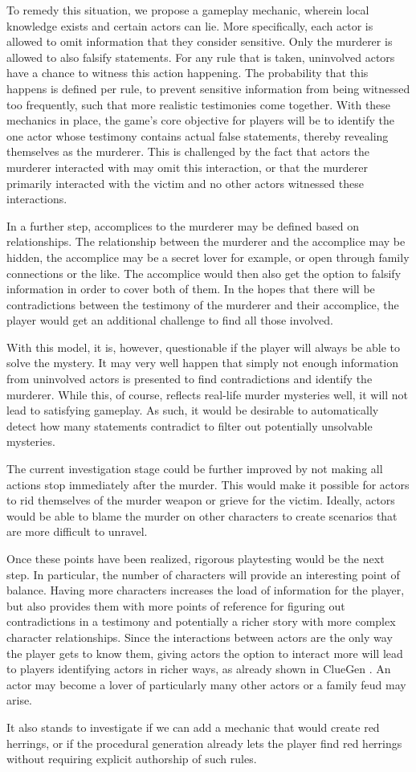 To remedy this situation, we propose a gameplay mechanic, wherein local knowledge exists and certain actors can lie.
More specifically, each actor is allowed to omit information that they consider sensitive.
Only the murderer is allowed to also falsify statements.
For any rule that is taken, uninvolved actors have a chance to witness this action happening.
The probability that this happens is defined per rule, to prevent sensitive information from being witnessed too frequently, such that more realistic testimonies come together.
With these mechanics in place, the game's core objective for players will be to identify the one actor whose testimony contains actual false statements, thereby revealing themselves as the murderer.
This is challenged by the fact that actors the murderer interacted with may omit this interaction, or that the murderer primarily interacted with the victim and no other actors witnessed these interactions.

In a further step, accomplices to the murderer may be defined based on relationships.
The relationship between the murderer and the accomplice may be hidden, the accomplice may be a secret lover for example, or open through family connections or the like.
The accomplice would then also get the option to falsify information in order to cover both of them.
In the hopes that there will be contradictions between the testimony of the murderer and their accomplice, the player would get an additional challenge to find all those involved.

With this model, it is, however, questionable if the player will always be able to solve the mystery.
It may very well happen that simply not enough information from uninvolved actors is presented to find contradictions and identify the murderer.
While this, of course, reflects real-life murder mysteries well, it will not lead to satisfying gameplay.
As such, it would be desirable to automatically detect how many statements contradict to filter out potentially unsolvable mysteries.

The current investigation stage could be further improved by not making all actions stop immediately after the murder.
This would make it possible for actors to rid themselves of the murder weapon or grieve for the victim.
Ideally, actors would be able to blame the murder on other characters to create scenarios that are more difficult to unravel.

Once these points have been realized, rigorous playtesting would be the next step.
In particular, the number of characters will provide an interesting point of balance.
Having more characters increases the load of information for the player, but also provides them with more points of reference for figuring out contradictions in a testimony and potentially a richer story with more complex character relationships.
Since the interactions between actors are the only way the player gets to know them, giving actors the option to interact more will lead to players identifying actors in richer ways, as already shown in ClueGen \cite{stockdale_2016}.
An actor may become a lover of particularly many other actors or a family feud may arise.

It also stands to investigate if we can add a mechanic that would create red herrings, or if the procedural generation already lets the player find red herrings without requiring explicit authorship of such rules.
